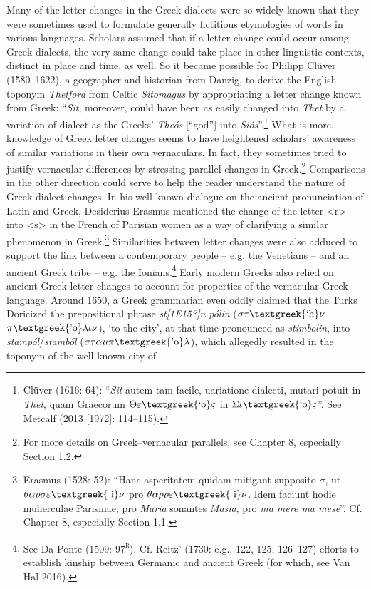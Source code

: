 \documentclass[12pt]{article}
\newenvironment{styleStandard}{\renewcommand\baselinestretch{1.25}\setlength\leftskip{0in}\setlength\rightskip{0in}\setlength\parindent{0.1972in}\setlength\parfillskip{0pt plus 1fil}\setlength\parskip{0in plus 1pt}\writerlistparindent\writerlistleftskip\leavevmode\normalfont\normalsize\writerlistlabel\ignorespaces}{\unskip\vspace{0in plus 1pt}\par}
\newcommand\writerlistleftskip{}
\newcommand\writerlistparindent{}
\newcommand\writerlistlabel{}
\begin{document}
\begin{styleStandard}
Many of the letter changes in the Greek dialects were so widely known that they were sometimes used to formulate generally fictitious etymologies of words in various languages. Scholars assumed that if a letter change could occur among Greek dialects, the very same change could take place in other linguistic contexts, distinct in place and time, as well. So it became possible for Philipp Clüver (1580–1622), a geographer and historian from Danzig, to derive the English toponym \textit{Thetford} from Celtic \textit{Sitomagus} by appropriating a letter change known from Greek: “\textit{Sit}, moreover, could have been as easily changed into \textit{Thet} by a variation of dialect as the Greeks’ \textit{Theós} [“god”]\textit{ }into \textit{Siós}”.\footnote{\textrm{ Clüver (1616: 64): “}\textrm{\textit{Sit}}\textrm{ autem tam facile, uariatione dialecti, mutari potuit in }\textrm{\textit{Thet}}\textrm{, quam Graecorum $\Theta \varepsilon \text{\textgreek{`o}}\varsigma $ in $\Sigma \iota \text{\textgreek{`o}}\varsigma $”. See Metcalf (2013 [1972]: 114–115).}} What is more, knowledge of Greek letter changes seems to have heightened scholars’ awareness of similar variations in their own vernaculars. In fact, they sometimes tried to justify vernacular differences by stressing parallel changes in Greek.\footnote{\textrm{ For more details on Greek–vernacular parallels, see Chapter 8, especially Section 1.2.}} Comparisons in the other direction could serve to help the reader understand the nature of Greek dialect changes. In his well-known dialogue on the ancient pronunciation of Latin and Greek, Desiderius Erasmus mentioned the change of the letter {\textless}r{\textgreater} into {\textless}s{\textgreater} in the French of Parisian women as a way of clarifying a similar phenomenon in Greek.\footnote{\textrm{ Erasmus (1528: 52): “Hanc asperitatem quidam mitigant supposito $\sigma $, ut $\theta \alpha \rho \sigma \varepsilon \text{\textgreek{~i}}\nu $ pro $\theta \alpha \rho \rho \varepsilon \text{\textgreek{~i}}\nu $. Idem faciunt hodie mulierculae Parisinae, pro }\textrm{\textit{Maria}}\textrm{ sonantes }\textrm{\textit{Masia}}\textrm{, pro }\textrm{\textit{ma mere ma mese}}\textrm{”. Cf. Chapter 8, especially Section 1.1.}} Similarities between letter changes were also adduced to support the link between a contemporary people – e.g. the Venetians – and an ancient Greek tribe – e.g. the Ionians.\footnote{\textrm{ See Da Ponte (1509: 97}\textrm{\textsc{\textsuperscript{r}}}\textrm{). Cf. Reitz’ (1730: e.g., 122, 125, 126–127) efforts to establish kinship between Germanic and ancient Greek (for which, see Van Hal 2016).}} Early modern Greeks also relied on ancient Greek letter changes to account for properties of the vernacular Greek language. Around 1650, a Greek grammarian even oddly claimed that the Turks Doricized the prepositional phrase \textit{st[1E15?]n pólin} ($\sigma \tau \text{\textgreek{`h}}\nu $ $\pi \text{\textgreek{'o}}\lambda \iota \nu $), ‘to the city’, at that time pronounced as \textit{stimbolin}, into \textit{stampól}/\textit{stamból} ($\sigma \tau \alpha \mu \pi \text{\textgreek{'o}}\lambda $), which allegedly resulted in the toponym of the well-known city of 
\end{styleStandard}
\end{document}
